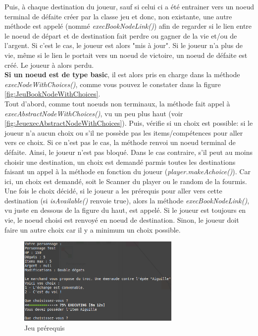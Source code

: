 		Puis, à chaque destination du joueur, sauf si celui ci a été entrainer vers un noeud terminal de défaite créer par la classe jeu et donc, non existante, une autre méthode est appelé (nommé \textit{execBookNodeLink()}) afin de regarder si le lien entre le noeud de départ et de destination fait perdre ou gagner de la vie et/ou de l'argent. Si c'est le cas, le joueur est alors "mis à jour". Si le joueur n'a plus de vie, même si le lien le portait vers un noeud de victoire, un noeud de défaite est créé. Le joueur à alors perdu. \\

		\textbf{Si un noeud est de type basic}, il est alors pris en charge dans la méthode \textit{execNodeWithChoices()}, comme vous pouvez le constater dans la figure \ref{fig:JeuBookNodeWithChoices}.\\
		Tout d'abord, comme tout noeuds non terminaux, la méthode fait appel à \textit{execAbstractNodeWithChoices()}, vu un peu plus haut (voir \ref{fig:JeuexecAbstractNodeWithChoices}). Puis, vérifie si un choix est possible: si le joueur n'a aucun choix ou s'il ne possède pas les items/compétences pour aller vers ce choix. Si ce n'est pas le cas, la méthode renvoi un noeud terminal de défaite. Ainsi, le joueur n'est pas bloqué. Dans le cas contraire, s'il peut au moins choisir une destination, un choix est demandé parmis toutes les destinations faisant un appel à la méthode en fonction du joueur (\textit{player.makeAchoice()}). Car ici, un choix est demandé, soit le Scanner du player ou le random de la fourmis. Une fois le choix décidé, si le joueur a les prérequis pour aller vers cette destination (si \textit{isAvailable()} renvoie true), alors la méthode \textit{execBookNodeLink()}, vu juste en dessous de la figure du haut, est appelé. Si le joueur est toujours en vie, le noeud choisi est renvoyé en noeud de destination. Sinon, le joueur doit faire un autre choix car il y a minimum un choix possible.\\

		\begin{figure}[H]
			\centering\includegraphics[width=0.70\textwidth]{img/codeJeuPrerequis.png}
			\caption{Jeu prérequis}
			\label{fig:codeJeuPrerequis}
		\end{figure}

